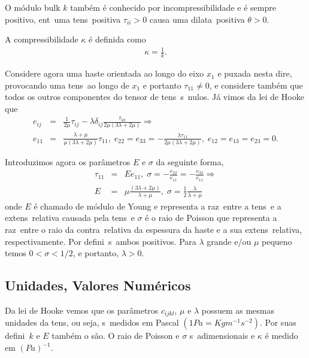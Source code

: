 O m\'odulo bulk $k$ tamb\'em \'e conhecido por incompressibilidade e \'e
sempre positivo, ent\ao\ uma tens\ao\ positiva $\tau_{ii}>0$ causa uma
dilata\cao\ positiva $\theta>0$.

A compressibilidade $\kappa$ \'e definida como
\begin{eqnarray}
\kappa = \frac{1}{k}.
\end{eqnarray}

Considere agora uma haste orientada ao longo do eixo $x_{1}$ e puxada
nesta dire\cao, provocando uma tens\ao\ ao longo de $x_{1}$ e portanto
$\tau_{11} \neq 0$, e considere tamb\'em que todos os outros componentes
do tensor de tens\ao\ s\ao\ nulos. J\'a vimos da lei de Hooke que
\begin{eqnarray}
e_{ij} &=& \frac{1}{2\mu}\tau_{ij} - \lambda\delta_{ij}\frac{\tau_{kk}}{2\mu(3\lambda + 2\mu)} \Longrightarrow \nonumber \\
e_{11} &=& \frac{\lambda + \mu}{\mu(3\lambda+2\mu)}\tau_{11}, \; 
e_{22} = e_{33} = -\frac{\lambda\tau_{11}}{2\mu(3\lambda+2\mu)}, \; e_{12} = e_{13} = e_{23} = 0.
\end{eqnarray}

Introduzimos agora os par\^ametros $E$ e $\sigma$ da seguinte forma,
\begin{eqnarray}
\tau_{11} &=& Ee_{11}, \; \sigma = -\frac{e_{22}}{e_{11}} = -\frac{e_{33}}{e_{11}} \Longrightarrow \nonumber \\
E &=& \mu\frac{(3\lambda + 2\mu)}{\lambda + \mu}, \; \sigma = \frac{1}{2}\frac{\lambda}{\lambda + \mu}
\end{eqnarray}
onde $E$ \'e chamado de m\'odulo de Young e representa a raz\ao\ entre a
tens\ao\ e a extens\ao\ relativa causada pela tens\ao\, e $\sigma$ \'e o
raio de Poisson que representa a raz\ao\ entre o raio da contra\cao\
relativa da espessura da haste e a sua extens\ao\ relativa,
respectivamente. Por defini\cao\ s\ao\ ambos positivos. Para $\lambda$
grande e/ou $\mu$ pequeno temos $0<\sigma<1/2$, e portanto, $\lambda>0$.

\subsection{Unidades, Valores Num\'ericos}

Da lei de Hooke vemos que os par\^ametros $c_{ijkl}$, ${\mu}$ e
${\lambda}$ possuem as mesmas unidades da tens\ao, ou seja, s\ao\
medidos em Pascal $(1Pa = Kgm^{-1}s^{-2})$. Por suas defini\coes\ $k$ e
$E$ tamb\'em o s\~ao. O raio de Poisson e $\sigma$ s\ao\ adimensionais e
$\kappa$ \'e medido em $(Pa)^{-1}$.

